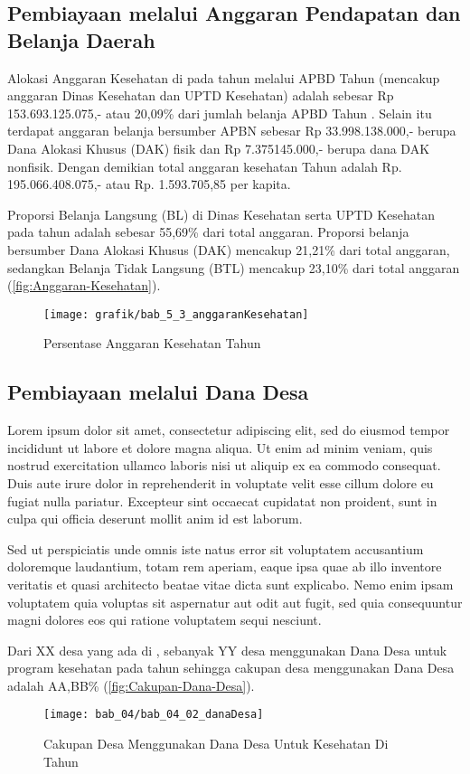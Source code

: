 \subsection{Pembiayaan melalui Anggaran Pendapatan dan Belanja Daerah}
Alokasi Anggaran Kesehatan di \namaKabupaten pada tahun
\tP melalui APBD \namaKabupaten Tahun \tP (mencakup anggaran
Dinas Kesehatan dan UPTD Kesehatan) adalah sebesar
Rp  153.693.125.075,- atau 20,09\% dari jumlah belanja APBD \namaKabupaten Tahun \tP. Selain itu terdapat anggaran belanja bersumber
APBN sebesar Rp 33.998.138.000,- berupa Dana Alokasi Khusus (DAK)
fisik dan  Rp 7.375145.000,- berupa dana DAK nonfisik. Dengan demikian total anggaran kesehatan \namaKabupaten
Tahun \tP adalah Rp. 195.066.408.075,- atau Rp. 1.593.705,85 per
kapita.

Proporsi Belanja Langsung (BL) di Dinas Kesehatan serta UPTD Kesehatan pada tahun \tP adalah sebesar 55,69\% dari total anggaran. Proporsi belanja bersumber Dana Alokasi Khusus (DAK) mencakup 21,21\% dari total anggaran, sedangkan Belanja Tidak Langsung (BTL) mencakup 23,10\% dari total anggaran (\autoref{fig:Anggaran-Kesehatan}).

\begin{figure}[H]
    \centering{}
    \texttt{[image: grafik/bab\_5\_3\_anggaranKesehatan]}
    \caption{Persentase Anggaran Kesehatan \namaKabupaten Tahun \tP}
    \label{fig:Anggaran-Kesehatan}
\end{figure}

\subsection{Pembiayaan melalui Dana Desa}
Lorem ipsum dolor sit amet, consectetur adipiscing elit, sed do eiusmod tempor incididunt ut labore et dolore magna aliqua. Ut enim ad minim veniam, quis nostrud exercitation ullamco laboris nisi ut aliquip ex ea commodo consequat. Duis aute irure dolor in reprehenderit in voluptate velit esse cillum dolore eu fugiat nulla pariatur. Excepteur sint occaecat cupidatat non proident, sunt in culpa qui officia deserunt mollit anim id est laborum.

Sed ut perspiciatis unde omnis iste natus error sit voluptatem accusantium doloremque laudantium, totam rem aperiam, eaque ipsa quae ab illo inventore veritatis et quasi architecto beatae vitae dicta sunt explicabo. Nemo enim ipsam voluptatem quia voluptas sit aspernatur aut odit aut fugit, sed quia consequuntur magni dolores eos qui ratione voluptatem sequi nesciunt.

Dari XX desa yang ada di \namaKabupaten, sebanyak YY desa menggunakan Dana Desa untuk program kesehatan pada tahun \tP sehingga cakupan desa menggunakan Dana Desa adalah AA,BB\% (\autoref{fig:Cakupan-Dana-Desa}).

\begin{figure}[H]
    \centering{}
    \texttt{[image: bab\_04/bab\_04\_02\_danaDesa]}
    \caption{Cakupan Desa Menggunakan Dana Desa Untuk Kesehatan Di \namaKabupaten Tahun \tP}
    \label{fig:Cakupan-Dana-Desa}
\end{figure}
